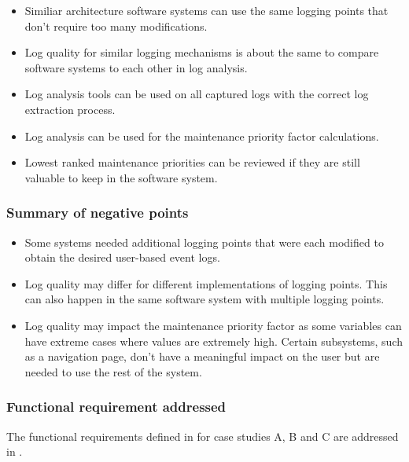\begin{itemize}
	\item Similiar architecture software systems can use the same logging points that don't require too many modifications.
	\item Log quality for similar logging mechanisms is about the same to compare software systems to each other in log analysis.
	\item Log analysis tools can be used on all captured logs with the correct log extraction process.
	\item Log analysis can be used for the maintenance priority factor calculations.
	\item Lowest ranked maintenance priorities can be reviewed if they are still valuable to keep in the software system.
\end{itemize}

\subsubsection{Summary of negative points}

\begin{itemize}
	\item Some systems needed additional logging points that were each modified to obtain the desired user-based event logs.
	\item Log quality may differ for different implementations of logging points. This can also happen in the same software system with multiple logging points.
	\item Log quality may impact the maintenance priority factor as some variables can have extreme cases where values are extremely high. Certain subsystems, such as a navigation page, don't have a meaningful impact on the user but are needed to use the rest of the system.
\end{itemize}

\clearpage

\subsubsection{Functional requirement addressed}
The functional requirements defined in  for case studies A, B and C are addressed in .

